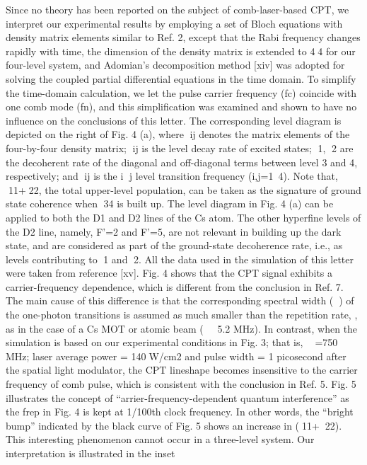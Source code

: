 \documentclass[%
reprint,  
aps,
prl,
showpacs,
]{revtex4}
\begin{document}
Since no theory has been reported on the subject of comb-laser-based CPT, we 
interpret our experimental results by employing a set of Bloch equations with 
density matrix elements similar to Ref. 2, except that the Rabi frequency changes 
rapidly with time, the dimension of the density matrix is extended to 44 for our 
four-level system, and Adomian’s decomposition method [xiv] was adopted for solving 
the coupled partial differential equations in the time domain. To simplify the 
time-domain calculation, we let the pulse carrier frequency (fc) coincide with 
one comb mode (fn), and this simplification was examined and shown to have no 
influence on the conclusions of this letter. The corresponding level diagram is 
depicted on the right of Fig. 4 (a), where ij denotes the matrix elements of the 
four-by-four density matrix; ij is the level decay rate of excited states; 1, 2 
are the decoherent rate of the diagonal and off-diagonal terms between level 3 and 4, 
respectively; and ij is the i j level transition frequency (i,j=1~4). Note that,
11+22, the total upper-level population, can be taken as the signature of ground 
state coherence when 34 is built up. The level diagram in Fig. 4 (a) can be applied 
to both the D1 and D2 lines of the Cs atom. The other hyperfine levels of the D2 line,
namely, F’=2 and F’=5, are not relevant in building up the dark state, and are 
considered as part of the ground-state decoherence rate, i.e., as levels contributing 
to 1 and 2. All the data used in the simulation of this letter were taken from 
reference [xv]. Fig. 4 shows that the CPT signal exhibits a carrier-frequency dependence, 
which is different from the conclusion in Ref. 7. The main cause of this difference 
is that the corresponding spectral width () of the one-photon transitions is 
assumed as much smaller than the repetition rate, , as in the case of a Cs MOT 
or atomic beam (5.2 MHz). In contrast, when the simulation is based on our 
experimental conditions in Fig. 3; that is,  =750 MHz; laser average power = 
140W/cm2 and pulse width = 1 picosecond after the spatial light modulator, the 
CPT lineshape becomes insensitive to the carrier frequency of comb pulse, which 
is consistent with the conclusion in Ref. 5. Fig. 5 illustrates the concept of 
``arrier-frequency-dependent quantum interference'' as the frep in Fig. 4 is kept 
at 1/100th clock frequency. In other words, the ``bright bump'' indicated by the 
black curve of Fig. 5 shows an increase in (11+22). This interesting phenomenon 
cannot occur in a three-level system. Our interpretation is illustrated in the inset 
\end{document}
